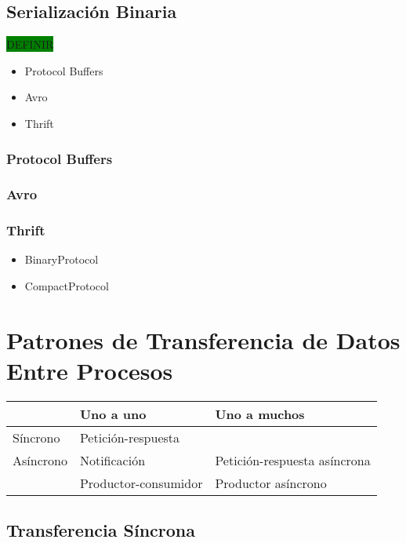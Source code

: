 \subsection{Serialización Binaria}
\colorbox{green}{DEFINIR}

\begin{itemize}
  \item Protocol Buffers
  \item Avro
  \item Thrift
\end{itemize}

\subsubsection{Protocol Buffers}
\subsubsection{Avro}
\subsubsection{Thrift}

\begin{itemize}
  \item BinaryProtocol 
  \item CompactProtocol
\end{itemize}

\section{Patrones de Transferencia de Datos Entre Procesos}

\begin{table}[]
  \begin{tabular}{@{}lll@{}}
  \toprule
            & Uno a uno            & Uno a muchos                 \\ \midrule
  Síncrono  & Petición-respuesta   &                              \\ \midrule
  Asíncrono & Notificación         & Petición-respuesta asíncrona \\ 
            & Productor-consumidor & Productor asíncrono          \\ \bottomrule
  \end{tabular}
\end{table}

\subsection{Transferencia Síncrona}


